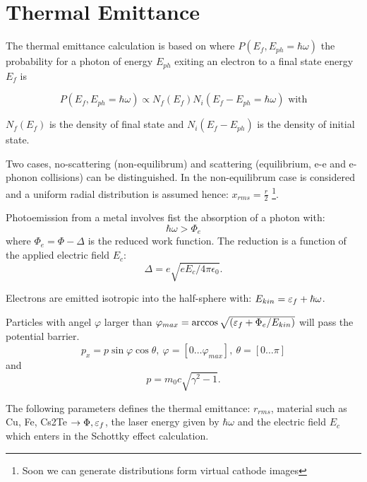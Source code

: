 \section{Thermal Emittance}
\label{sec:them}
The thermal emittance calculation is based on \cite{flo:97, clen:2000} where  $P(E_f,E_{ph}=\hbar\omega)$ the probability for a photon of energy $E_{ph}$ exiting an electron to a final state energy $E_f$ is

\begin{equation} P(E_f,E_{ph}=\hbar\omega) \propto N_f(E_f) N_i(E_f - E_{ph}=\hbar\omega) \text{ with}\end{equation}


 $N_f(E_f)$ is the density of final state
and $N_i(E_f - E_{ph})$ is the density of initial state.

Two cases, no-scattering (non-equilibrum) and scattering (equilibrium, e-e and e-phonon collisions) can be distinguished. In \opal the non-equilibrum case is considered and a uniform radial distribution is assumed hence: $x_{rms} = \frac{r}{2}$ \footnote{Soon we can generate distributions form virtual cathode images}.

Photoemission from a metal involves fist the absorption of a photon with:
\begin{equation} 
\hbar\omega > \Phi_e
\end{equation}
where $\Phi_e = \Phi - \Delta$ is the reduced work function.
The reduction is a function of the applied electric field $E_c$:
\begin{equation}
\Delta = e \sqrt{e E_c / 4 \pi \epsilon_0}.
\end{equation}

Electrons are emitted isotropic into the half-sphere with: $E_{kin} = \eps_{f} + \hbar\omega$.

Particles with angel $\varphi$ larger than $\varphi_{max}=\arccos{\sqrt{(\eps_f + \Phi_e / E_{kin})}}$ will pass the potential barrier. 
\begin{equation} p_x = p \sin{\varphi} \cos{\theta},~ \varphi=[0\dots \varphi_{max}],~  \theta=[0\dots \pi] \end{equation}
and 
\begin{equation} p= m_0 c \sqrt{\gamma^2 - 1}. \end{equation}

The following parameters defines the thermal emittance:  $r_{rms}$, material such as Cu, Fe, Cs2Te $\rightarrow \Phi, \eps_f$, 
the laser energy given by $\hbar\omega$ and the electric field $E_c$ which enters in the Schottky effect calculation.

